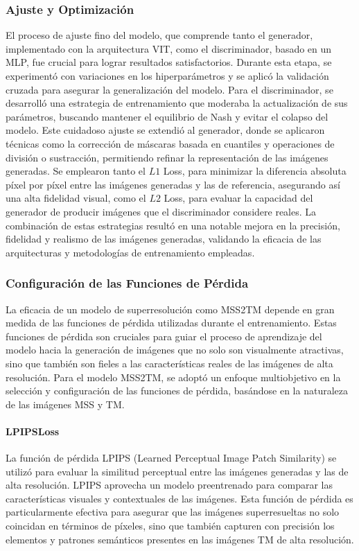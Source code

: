             \subsubsection{Ajuste y Optimización}
                El proceso de ajuste fino del modelo, que comprende tanto el generador, implementado con la arquitectura VIT, como el discriminador, basado en un MLP, fue crucial para lograr resultados satisfactorios. Durante esta etapa, se experimentó con variaciones en los hiperparámetros y se aplicó la validación cruzada para asegurar la generalización del modelo. Para el discriminador, se desarrolló una estrategia de entrenamiento que moderaba la actualización de sus parámetros, buscando mantener el equilibrio de Nash y evitar el colapso del modelo. Este cuidadoso ajuste se extendió al generador, donde se aplicaron técnicas como la corrección de máscaras basada en cuantiles y operaciones de división o sustracción, permitiendo refinar la representación de las imágenes generadas. Se emplearon tanto el \(L1\) Loss, para minimizar la diferencia absoluta píxel por píxel entre las imágenes generadas y las de referencia, asegurando así una alta fidelidad visual, como el \(L2\) Loss, para evaluar la capacidad del generador de producir imágenes que el discriminador considere reales. La combinación de estas estrategias resultó en una notable mejora en la precisión, fidelidad y realismo de las imágenes generadas, validando la eficacia de las arquitecturas y metodologías de entrenamiento empleadas.

            
                \subsubsection{Configuración de las Funciones de Pérdida}
                    La eficacia de un modelo de superresolución como MSS2TM depende en gran medida de las funciones de pérdida utilizadas durante el entrenamiento. Estas funciones de pérdida son cruciales para guiar el proceso de aprendizaje del modelo hacia la generación de imágenes que no solo son visualmente atractivas, sino que también son fieles a las características reales de las imágenes de alta resolución. Para el modelo MSS2TM, se adoptó un enfoque multiobjetivo en la selección y configuración de las funciones de pérdida, basándose en la naturaleza de las imágenes MSS y TM.
                
                    \paragraph{LPIPSLoss}
                        La función de pérdida LPIPS (Learned Perceptual Image Patch Similarity) se utilizó para evaluar la similitud perceptual entre las imágenes generadas y las de alta resolución. LPIPS aprovecha un modelo preentrenado para comparar las características visuales y contextuales de las imágenes. Esta función de pérdida es particularmente efectiva para asegurar que las imágenes superresueltas no solo coincidan en términos de píxeles, sino que también capturen con precisión los elementos y patrones semánticos presentes en las imágenes TM de alta resolución.
                    
